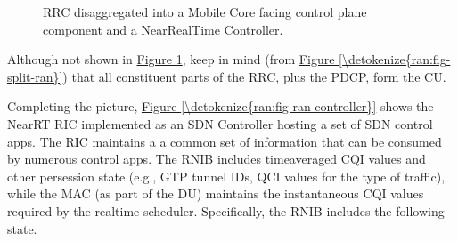 \documentclass[a4paper,11pt,english]{sphinxmanual}
\let\sphinxpxdimen\pdfpxdimen\else\newdimen\sphinxpxdimen
\begin{document}
\begin{figure}[ht]
\centering
\capstart

\noindent\sphinxincludegraphics[width=600\sphinxpxdimen]{{Slide18}.png}
\caption{RRC disaggregated into a Mobile Core facing control
plane component and a Near\sphinxhyphen{}Real\sphinxhyphen{}Time Controller.}\label{\detokenize{ran:id4}}\label{\detokenize{ran:fig-rrc-split}}\end{figure}

\sphinxAtStartPar
Although not shown in \hyperref[\detokenize{ran:fig-rrc-split}]{Figure \ref{\detokenize{ran:fig-rrc-split}}}, keep in mind
(from \hyperref[\detokenize{ran:fig-split-ran}]{Figure \ref{\detokenize{ran:fig-split-ran}}}) that all constituent parts of
the RRC, plus the PDCP, form the CU.

\sphinxAtStartPar
Completing the picture, \hyperref[\detokenize{ran:fig-ran-controller}]{Figure \ref{\detokenize{ran:fig-ran-controller}}} shows
the Near\sphinxhyphen{}RT RIC implemented as an SDN Controller hosting a
set of SDN control apps. The RIC maintains a \textendash{}a common set of information that can be consumed by numerous
control apps. The R\sphinxhyphen{}NIB includes time\sphinxhyphen{}averaged CQI values and other
per\sphinxhyphen{}session state (e.g., GTP tunnel IDs, QCI values for the type of
traffic), while the MAC (as part of the DU) maintains the
instantaneous CQI values required by the real\sphinxhyphen{}time
scheduler. Specifically, the R\sphinxhyphen{}NIB includes the following state.
\end{document}
